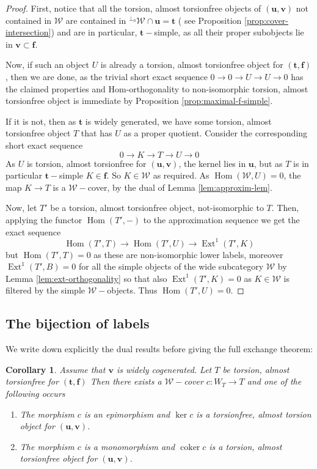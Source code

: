 \documentclass[11pt]{amsart}
\newtheorem{corollary}[theorem]{Corollary}
\theoremstyle{definition}
\newcommand{\coker}{\operatorname{coker}}
\newcommand{\Hom}{\operatorname{Hom}}
\newcommand{\Ext}{\operatorname{Ext}}
\newcommand{\tpair}[2]{(\mathbf{#1}, \mathbf{#2})  }
\begin{document}
\begin{proof}
First, notice that all the torsion, almost torsionfree objects of \( \tpair{u}{v} \) not contained in \( \mathcal{W} \) are contained in \( {}^{\perp_0}\mathcal{W} \cap \mathbf{u} = \mathbf{t} \) ( see Proposition \ref{prop:cover-intersection}) and are in particular, \( \mathbf{t}-\)simple, as all their proper subobjects lie in \( \mathbf{v} \subset \mathbf{f} \). 

Now, if such an object \( U \) is already a torsion, almost torsionfree object for \( \tpair{t}{f} \), then we are done, as the trivial short exact sequence \( 0 \to 0 \to U \to U \to 0 \) has the claimed properties and Hom-orthogonality to non-isomorphic torsion, almost torsionfree object is immediate by Proposition \ref{prop:maximal-f-simple}. 

If it is not, then as \( \mathbf{t} \) is widely generated, we have some torsion, almost torsionfree object \( T \) that has \( U \) as a proper quotient. Consider the corresponding short exact sequence
\[
0 \to K \to T \to U \to 0
\]
As \( U \) is torsion, almost torsionfree for \( \tpair{u}{v} \), the kernel lies in \( \mathbf{u} \), but as \( T \) is in particular \( \mathbf{t}-\)simple \( K \in \mathbf{f} \). So \( K \in \mathcal{W} \) as required.
As \( \Hom(\mathcal{W}, U) = 0 \), the map \( K \to T \) is a \( \mathcal{W}-\)cover, by the dual of Lemma \ref{lem:approxim-lem}.

Now, let \( T' \) be a torsion, almost torsionfree object, not-isomorphic to \( T \). Then, applying the functor \( \Hom(T', -) \) to the approximation sequence we get the exact sequence
\[
\Hom(T', T) \to \Hom(T', U) \to \Ext^1(T', K)
\]
but \( \Hom( T', T) = 0 \) as these are non-isomorphic lower labels, moreover \( \Ext^1(T', B) = 0 \) for all the simple objects of the wide subcategory \( \mathcal{W} \) by Lemma \ref {lem:ext-orthogonality} so that also \( \Ext^1(T', K) = 0 \) as \( K \in \mathcal{W} \) is filtered by the simple \(\mathcal{W}-\)objects.
Thus \( \Hom(T', U) = 0 \).
\end{proof}

\subsection{The bijection of labels}

We write down explicitly the dual results before giving the full exchange theorem:

\begin{corollary}
\label{cor:up-exchange-dual}
Assume that \(\mathbf v\) is widely cogenerated. Let \(T\)  be torsion, almost torsionfree for \(\tpair{t}{f}\)
Then there exists a \( \mathcal{W}-\)cover \( c : W_T \to T \) and one of the following occurs
\begin{enumerate}
\item The morphism \(c \) is an epimorphism and \(\ker c \) is a torsionfree, almost torsion object for \( \tpair{u}{v} \).
\item The morphism \(c \) is a monomorphism and \( \coker c \) is a torsion, almost torsionfree object for \( \tpair{u}{v} \).
\end{enumerate}
\end{corollary}
\end{document}

